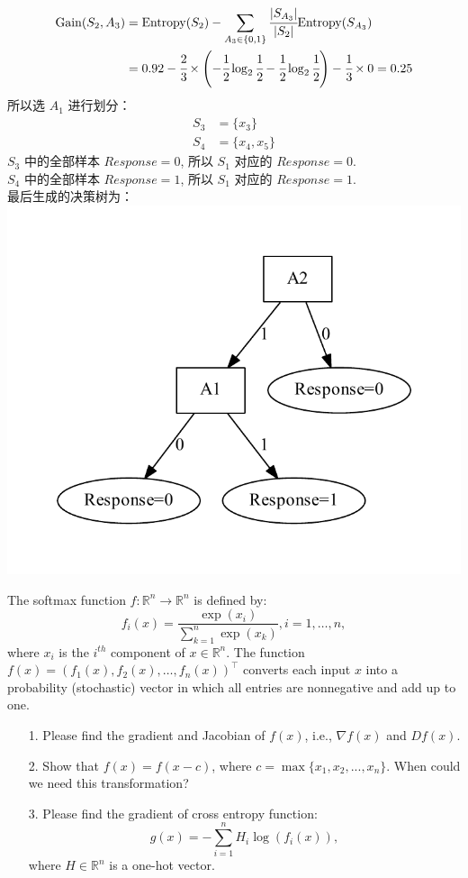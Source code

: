 \documentclass[11pt,letter,notitlepage]{article}
\begin{document}
\begin{solution}
$$\begin{aligned}
			{\rm Gain}(S_2,A_3)
			 & = {\rm Entropy}(S_2)-\sum_{A_3\in\{0,1\}}\cfrac{|S_{A_3}|}{|S_2|}{\rm Entropy}(S_{A_3}) \\
			 & =0.92
			-\cfrac{2}{3}\times\left(-\cfrac{1}{2}\log_2\cfrac{1}{2}-\cfrac{1}{2}\log_2\cfrac{1}{2}\right)
			-\cfrac{1}{3}\times0
			=0.25
		\end{aligned}$$
	所以选 $A_1$ 进行划分：
	$$\begin{aligned}
			S_3 & =\{x_3\}     \\
			S_4 & =\{x_4,x_5\}
		\end{aligned}$$
	$S_3$ 中的全部样本 $Response=0$, 所以 $S_1$ 对应的 $Response=0$. \\
	$S_4$ 中的全部样本 $Response=1$, 所以 $S_1$ 对应的 $Response=1$. \\
	最后生成的决策树为： \\
	\includegraphics{solution1_tree.pdf}

\end{solution}
\newpage

\begin{exercise}
	The softmax function $f:\mathbb{R}^n\rightarrow\mathbb{R}^n$ is defined by:
	$$f_i(x)=\frac{\exp(x_i)}{\sum_{k=1}^{n}\exp(x_k)}, i=1,\ldots,n,$$
	where $x_i$ is the $i^{th}$ component of $x\in\mathbb{R}^n$. The function  $f(x)=(f_1(x),f_2(x),\ldots,f_n(x))^{\top}$ converts each input $x$ into a probability (stochastic) vector in which all entries are nonnegative and add up to one.
	\begin{itemize}
		\item[1.] Please find the gradient and Jacobian of $f(x)$, i.e., $\nabla f(x)$ and $Df(x)$.

		\item[2.] Show that $f(x)=f(x-c)$, where $c=\max\{x_1,x_2,...,x_n\}$. When could we need this transformation?

		\item[3.] Please find the gradient of cross entropy function:
		      $$g(x)=-\sum_{i=1}^{n}H_i\log(f_i(x)),$$
		      where $H\in\mathbb{R}^n$ is a one-hot vector.
	\end{itemize}
\end{exercise}
\end{document}
